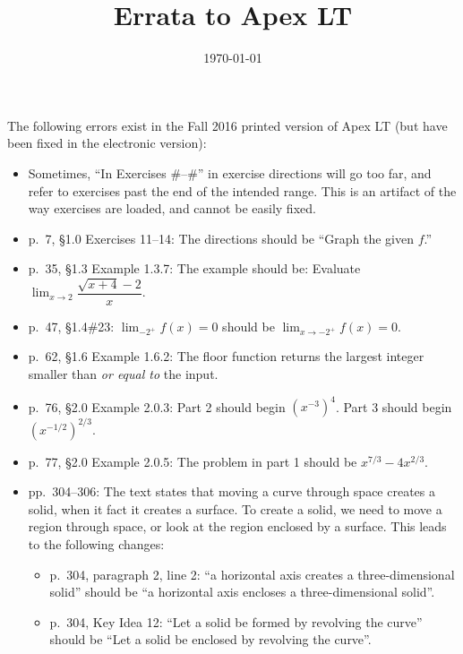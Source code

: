 \documentclass{amsart}
\title{Errata to Apex LT}
\date{\today}
\newcommand{\ds}{\displaystyle}
\begin{document}
\maketitle

The following errors exist in the Fall 2016 printed version of Apex LT (but have been fixed in the electronic version):
\begin{itemize}
\item Sometimes, ``In Exercises \#--\#'' in exercise directions will go too far, and refer to exercises past the end of the intended range.  This is an artifact of the way exercises are loaded, and cannot be easily fixed.
\item p.\ 7, \S1.0 Exercises 11--14: The directions should be ``Graph the given $f$.''
\item p.\ 35, \S1.3 Example 1.3.7: The example should be: Evaluate $\ds\lim_{x\to 2}\dfrac{\sqrt{x+4}-2}x$.
\item p.\ 47, \S1.4\#23: $\ds\lim_{-2^+}f(x)=0$ should be $\ds\lim_{x\to-2^+}f(x)=0$.
\item p.\ 62, \S1.6 Example 1.6.2: The floor function returns the largest integer smaller than \emph{or equal to} the input.
\item p.\ 76, \S2.0 Example 2.0.3: Part 2 should begin $(x^{-3})^4$.  Part 3 should begin $(x^{-1/2})^{2/3}$.
\item p.\ 77, \S2.0 Example 2.0.5: The problem in part 1 should be $x^{7/3}-4x^{2/3}$.
\item pp.\ 304--306: The text states that moving a curve through space creates a solid, when it fact it creates a surface.  To create a solid, we need to move a region through space, or look at the region enclosed by a surface.  This leads to the following changes:
\begin{itemize}
\item p.\ 304, paragraph 2, line 2: ``a horizontal axis creates a three-dimensional solid'' should be ``a horizontal axis encloses a three-dimensional solid''.
\item p.\ 304, Key Idea 12: ``Let a solid be formed by revolving the curve'' should be ``Let a solid be enclosed by revolving the curve''.

\end{itemize}
\end{itemize}
\end{document}
